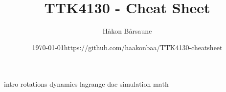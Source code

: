 \documentclass{article}
\title{TTK4130 - Cheat Sheet}
\author{Håkon Bårsaune}
\date{\centering\today\endgraf\bigskip https://github.com/haakonbaa/TTK4130-cheatsheet}
\begin{document}
\maketitle

\tableofcontents

\newpage

\begin{multicols}{2}
{intro} \newpage
{rotations}\newpage
{dynamics}\newpage
{lagrange} \newpage
{dae}\newpage
{simulation}\newpage
{math}
\end{multicols}
\end{document}
